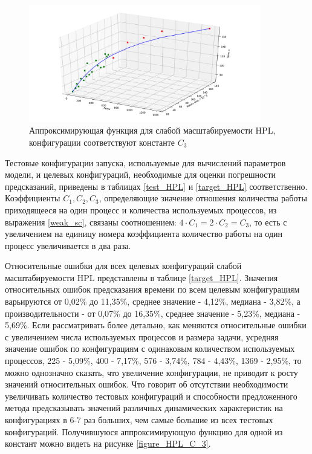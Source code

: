 	\begin{figure}
		\centering
		\includegraphics[width=0.9\textwidth]{./images/hpl_k3}
		\caption{Аппроксимирующая функция для слабой масштабируемости HPL, конфигурации соответствуют константе \(C_3\)}
		\label{figure_HPL_C_3}
	\end{figure}

	Тестовые конфигурации запуска, используемые для вычислений параметров модели, и целевых конфигураций, необходимые для оценки погрешности предсказаний, приведены в таблицах \eqref{test_HPL} и \eqref{target_HPL} соответственно. Коэффициенты \(C_1, C_2, C_3\), определяющие значение отношения количества работы приходящееся на один процесс и количества используемых процессов, из выражения \eqref{weak_sc}, связаны соотношением: \(4 \cdot C_1 = 2 \cdot C_2 = C_3 \), то есть с увеличением на единицу номера коэффициента количество работы на один процесс увеличивается в два раза.

	Относительные ошибки для всех целевых конфигураций слабой масштабируемости HPL представлены в таблице \eqref{target_HPL}. Значения относительных ошибок предсказания времени по всем целевым конфигурациям варьируются от 0,02\% до 11,35\%, среднее значение - 4,12\%, медиана - 3,82\%, а производительности - от 0,07\% до 16,35\%, среднее значение - 5,23\%, медиана - 5,69\%. Если рассматривать более детально, как меняются относительные ошибки с увеличением числа используемых процессов и размера задачи, усредняя значение ошибок по конфигурациям с одинаковым количеством используемых процессов, 225 - 5,09\%, 400 - 7,17\%, 576 - 3,74\%, 784 - 4,43\%, 1369 - 2,95\%, то можно однозначно сказать, что увеличение конфигурации, не приводит к росту значений относительных ошибок. Что говорит об отсутствии необходимости увеличивать количество тестовых конфигураций и способности предложенного метода предсказывать значений различных динамических характеристик на конфигурациях в 6-7 раз больших, чем самые большие из всех тестовых конфигураций. Получившуюся аппроксимирующую функцию для одной из констант можно видеть на рисунке \eqref{figure_HPL_C_3}.

